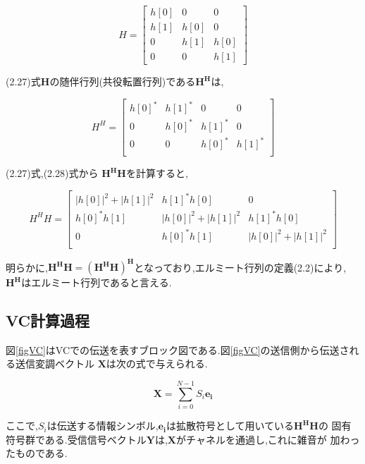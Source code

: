 \begin{equation}
    H = \left[
        \begin{array}{ccc}
            h[0] & 0 & 0 \\
            h[1] & h[0] & 0 \\
            0 & h[1] & h[0] \\
            0 & 0 & h[1]
        \end{array}
    \right]
\end{equation}

(2.27)式$\bm{H}$の随伴行列(共役転置行列)である$\bm{H^H}$は,

\begin{equation}
    H^H = \left[
        \begin{array}{cccc}
            h[0]^* & h[1]^* & 0 & 0 \\
            0 & h[0]^* & h[1]^* & 0 \\
            0 & 0 & h[0]^* & h[1]^* \\
        \end{array}
    \right]
\end{equation}

(2.27)式,(2.28)式から $\bm{H^HH}$を計算すると,

\begin{equation}
    H^HH = \left[
        \begin{array}{ccc}
            |h[0]|^2+|h[1]|^2 & h[1]^*h[0] & 0 \\
            h[0]^*h[1] & |h[0]|^2+|h[1]|^2 & h[1]^*h[0] \\
            0 & h[0]^*h[1] & |h[0]|^2+|h[1]|^2 \\
        \end{array}
    \right]
\end{equation}

明らかに,$\bm{H^HH=(H^HH)^H}$となっており,エルミート行列の定義(2.2)により,
$\bm{H^H}$はエルミート行列であると言える.

\subsection{VC計算過程}
図\ref{figVC}はVCでの伝送を表すブロック図である.図\ref{figVC}の送信側から伝送される送信変調ベクトル
$\bm{X}$は次の式で与えられる.

\begin{equation}
    \bm{X} = \sum_{i=0}^{N-1} S_i\bm{e_i}
\end{equation}

ここで,$S_i$は伝送する情報シンボル,$\bm{e_i}$は拡散符号として用いている$\bm{H^HH}$の
固有符号群である.受信信号ベクトル$\bm{Y}$は,$\bm{X}$がチャネルを通過し,これに雑音が
加わったものである.

